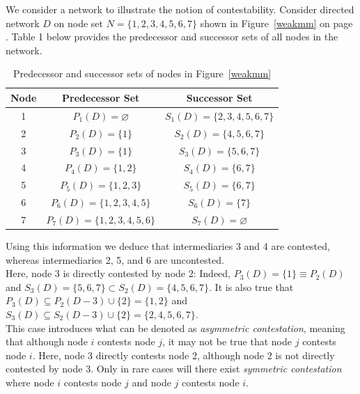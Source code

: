 \begin{example} \label{Simple Contestability}
We consider a network to illustrate the notion of contestability. Consider directed network $D$ on node set $N = \{1,2,3,4,5,6,7\}$ shown in Figure~\ref{weakmm} on page \pageref{weakmm}. Table 1 below provides the predecessor and successor sets of all nodes in the network.

\begin{table}[h]
\begin{center}
\begin{tabular}{ccc}
\hline \hline
Node & Predecessor Set  & Successor Set                     \\
\hline
1    & $P_{1}(D)=\varnothing$          & $S_{1}(D)=\{2,3,4,5,6,7\}$        \\
2    & $P_{2}(D)=\{1\}$                & $S_{2}(D)=\{4,5,6,7\}$            \\
3    & $P_{3}(D)=\{1\}$                & $S_{3}(D)=\{5,6,7\}$              \\
4    & $P_{4}(D)=\{1,2\}$              & $S_{4}(D)=\{6,7\}$                \\
5    & $P_{5}(D)=\{1,2,3\}$            & $S_{5}(D)=\{6,7\}$                \\
6    & $P_{6}(D)=\{1,2,3,4,5\}$        & $S_{6}(D)=\{7\}$                  \\
7    & $P_{7}(D)=\{1,2,3,4,5,6\}$      & $S_{7}(D)=\varnothing$  \\
\hline \hline
\end{tabular}

\caption{Predecessor and successor sets of nodes in Figure~\ref{weakmm}}
\label{network1stats}
\end{center}
\end{table}

\noindent
Using this information we deduce that intermediaries 3 and 4 are contested, whereas intermediaries 2, 5, and 6 are uncontested.
\\
Here, node 3 is directly contested by node 2: Indeed, $P_{3}(D) = \{1\} \equiv P_{2}(D)$ and $S_{3}(D) = \{5,6,7\} \subset S_{2}(D) = \{4,5,6,7\}$. It is also true that $P_{3}(D) \subseteq P_{2}(D - 3) \cup \{2\} = \{ 1,2 \}$ and $S_{3}(D) \subseteq S_{2}(D - 3) \cup \{2\} = \{ 2,4,5,6,7 \}$.
\\
This case introduces what can be denoted as \textit{asymmetric contestation}, meaning that although node $i$ contests node $j$, it may not be true that node $j$ contests node $i$. Here, node 3 directly contests node 2, although node 2 is not directly contested by node 3. Only in rare cases will there exist \textit{symmetric contestation} where node $i$ contests node $j$ and node $j$ contests node $i$.
\end{example}

